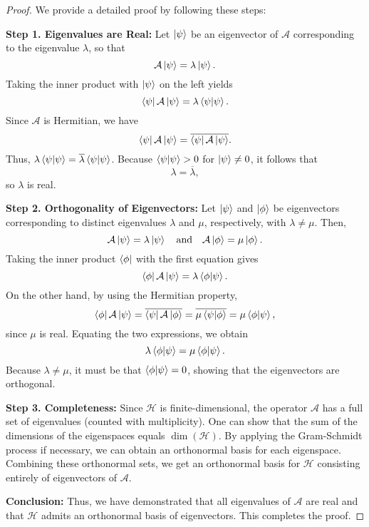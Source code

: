 	\begin{proof}
		We provide a detailed proof by following these steps:
		
		\textbf{Step 1. Eigenvalues are Real:}  
		Let \(\left| \psi \right\rangle\) be an eigenvector of \(\mathcal{A}\) corresponding to the eigenvalue \(\lambda\), so that
		\[
		\mathcal{A}\left| \psi \right\rangle = \lambda \left| \psi \right\rangle.
		\]
		Taking the inner product with \(\left| \psi \right\rangle\) on the left yields
		\[
		\left\langle \psi \right|\mathcal{A}\left| \psi \right\rangle = \lambda \left\langle \psi \middle| \psi \right\rangle.
		\]
		Since \(\mathcal{A}\) is Hermitian, we have
		\[
		\left\langle \psi \right|\mathcal{A}\left| \psi \right\rangle = \overline{\left\langle \psi \right|\mathcal{A}\left| \psi \right\rangle}.
		\]
		Thus, \(\lambda \left\langle \psi \middle| \psi \right\rangle = \overline{\lambda}\left\langle \psi \middle| \psi \right\rangle\). Because \(\left\langle \psi \middle| \psi \right\rangle > 0\) for \(\left| \psi \right\rangle \neq 0\), it follows that
		\[
		\lambda = \overline{\lambda},
		\]
		so \(\lambda\) is real.
		
		\textbf{Step 2. Orthogonality of Eigenvectors:}  
		Let \(\left| \psi \right\rangle\) and \(\left| \phi \right\rangle\) be eigenvectors corresponding to distinct eigenvalues \(\lambda\) and \(\mu\), respectively, with \(\lambda \neq \mu\). Then,
		\[
		\mathcal{A}\left| \psi \right\rangle = \lambda \left| \psi \right\rangle \quad \text{and} \quad \mathcal{A}\left| \phi \right\rangle = \mu \left| \phi \right\rangle.
		\]
		Taking the inner product \(\left\langle \phi \right|\) with the first equation gives
		\[
		\left\langle \phi \right|\mathcal{A}\left| \psi \right\rangle = \lambda \left\langle \phi \middle| \psi \right\rangle.
		\]
		On the other hand, by using the Hermitian property,
		\[
		\left\langle \phi \right|\mathcal{A}\left| \psi \right\rangle = \overline{\left\langle \psi \right|\mathcal{A}\left| \phi \right\rangle} = \overline{\mu \left\langle \psi \middle| \phi \right\rangle} = \mu \left\langle \phi \middle| \psi \right\rangle,
		\]
		since \(\mu\) is real. Equating the two expressions, we obtain
		\[
		\lambda \left\langle \phi \middle| \psi \right\rangle = \mu \left\langle \phi \middle| \psi \right\rangle.
		\]
		Because \(\lambda \neq \mu\), it must be that \(\left\langle \phi \middle| \psi \right\rangle = 0\), showing that the eigenvectors are orthogonal.
		
		\textbf{Step 3. Completeness:}  
		Since \(\mathcal{H}\) is finite-dimensional, the operator \(\mathcal{A}\) has a full set of eigenvalues (counted with multiplicity). One can show that the sum of the dimensions of the eigenspaces equals \(\dim(\mathcal{H})\). By applying the Gram-Schmidt process if necessary, we can obtain an orthonormal basis for each eigenspace. Combining these orthonormal sets, we get an orthonormal basis for \(\mathcal{H}\) consisting entirely of eigenvectors of \(\mathcal{A}\).
		
		\textbf{Conclusion:}  
		Thus, we have demonstrated that all eigenvalues of \(\mathcal{A}\) are real and that \(\mathcal{H}\) admits an orthonormal basis of eigenvectors. This completes the proof.
	\end{proof}
	
